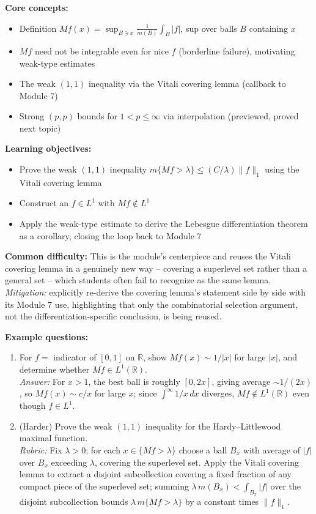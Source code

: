 \documentclass[11pt]{article}
\begin{document}
\textbf{Core concepts:}
\begin{itemize}[nosep]
\item Definition $Mf(x)=\sup_{B\ni x}\frac{1}{m(B)}\int_B|f|$, sup over balls $B$ containing $x$
\item $Mf$ need not be integrable even for nice $f$ (borderline failure), motivating weak-type estimates
\item The weak $(1,1)$ inequality via the Vitali covering lemma (callback to Module 7)
\item Strong $(p,p)$ bounds for $1<p\le\infty$ via interpolation (previewed, proved next topic)
\end{itemize}

\textbf{Learning objectives:}
\begin{itemize}[nosep]
\item Prove the weak $(1,1)$ inequality $m\{Mf>\lambda\}\le(C/\lambda)\|f\|_1$ using the Vitali covering lemma
\item Construct an $f\in L^1$ with $Mf\notin L^1$
\item Apply the weak-type estimate to derive the Lebesgue differentiation theorem as a corollary, closing the loop back to Module 7
\end{itemize}

\textbf{Common difficulty:} This is the module's centerpiece and reuses the Vitali covering lemma in a genuinely new way -- covering a superlevel set rather than a general set -- which students often fail to recognize as the same lemma. \textit{Mitigation:} explicitly re-derive the covering lemma's statement side by side with its Module 7 use, highlighting that only the combinatorial selection argument, not the differentiation-specific conclusion, is being reused.

\textbf{Example questions:}
\begin{enumerate}[nosep]
\item For $f=$ indicator of $[0,1]$ on $\mathbb{R}$, show $Mf(x)\sim1/|x|$ for large $|x|$, and determine whether $Mf\in L^1(\mathbb{R})$. \\
\textit{Answer:} For $x>1$, the best ball is roughly $[0,2x]$, giving average $\sim1/(2x)$, so $Mf(x)\sim c/x$ for large $x$; since $\int^\infty 1/x\,dx$ diverges, $Mf\notin L^1(\mathbb{R})$ even though $f\in L^1$.
\item (Harder) Prove the weak $(1,1)$ inequality for the Hardy--Littlewood maximal function. \\
\textit{Rubric:} Fix $\lambda>0$; for each $x\in\{Mf>\lambda\}$ choose a ball $B_x$ with average of $|f|$ over $B_x$ exceeding $\lambda$, covering the superlevel set. Apply the Vitali covering lemma to extract a disjoint subcollection covering a fixed fraction of any compact piece of the superlevel set; summing $\lambda\, m(B_x)<\int_{B_x}|f|$ over the disjoint subcollection bounds $\lambda\, m\{Mf>\lambda\}$ by a constant times $\|f\|_1$.
\end{enumerate}
\end{document}
